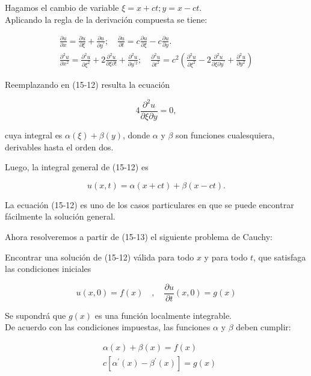 \documentclass[10pt]{article}
\theoremstyle{plain}
\theoremstyle{definition}
\theoremstyle{remark}
\begin{document}
Hagamos el cambio de variable $\xi=x+c t ; y=x-c t$.\\
Aplicando la regla de la derivación compuesta se tiene:

$$
\begin{gathered}
\frac{\partial u}{\partial x}=\frac{\partial u}{\partial \xi}+\frac{\partial u}{\partial y^{\prime}} ; \quad \frac{\partial u}{\partial t}=c \frac{\partial u}{\partial \xi}-c \frac{\partial u}{\partial y} . \\
\frac{\partial^{2} u}{\partial x^{2}}=\frac{\partial^{2} u}{\partial \xi^{2}}+2 \frac{\partial^{2} u}{\partial \xi \partial!}+\frac{\partial^{2} u}{\partial y^{\prime 2}} ; \quad \frac{\partial^{2} u}{\partial t^{2}}=c^{2}\left(\frac{\partial^{2} u}{\partial \xi^{2}}-2 \frac{\partial^{2} u}{\partial \xi \partial y^{\prime}}+\frac{\partial^{2} u}{\partial y^{2}}\right)
\end{gathered}
$$

Reemplazando en (15-12) resulta la ecuación

$$
4 \frac{\partial^{2} u}{\partial \xi \partial y}=0,
$$

cuya integral es $\alpha(\xi)+\beta(y)$, donde $\alpha$ y $\beta$ son funciones cualesquiera, derivables hasta el orden dos.

Luego, la integral general de (15-12) es


\begin{equation*}
u(x, t)=\alpha(x+c t)+\beta(x-c t) . \tag{15-13}
\end{equation*}


La ecuación (15-12) es uno de los casos particulares en que se puede encontrar fácilmente la solución general.

Ahora resolveremos a partir de (15-13) el siguiente problema de Cauchy:

Encontrar una solución de (15-12) válida para todo $x$ y para todo $t$, que satisfaga las condiciones iniciales

$$
u(x, 0)=f(x) \quad, \quad \frac{\partial u}{\partial t}(x, 0)=g(x)
$$

Se supondrá que $g(x)$ es una función localmente integrable.\\
De acuerdo con las condiciones impuestas, las funciones $\alpha$ y $\beta$ deben cumplir:


\begin{align*}
& \alpha(x)+\beta(x)=f(x) \\
& c\left[\alpha^{\prime}(x)-\beta^{\prime}(x)\right]=g(x) \tag{15-14}
\end{align*}
\end{document}
